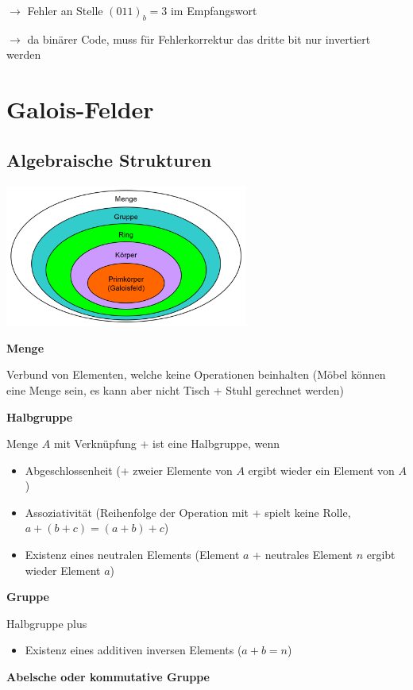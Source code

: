 $\rightarrow$ Fehler an Stelle $(011)_b = 3$ im Empfangswort

$\rightarrow$ da binärer Code, muss für Fehlerkorrektur das dritte bit nur invertiert werden

\section{Galois-Felder}
\label{sec:galois}

\subsection{Algebraische Strukturen}

\includegraphics[width=8cm]{img/algebraische_strukturen.PNG}

\textbf{Menge}

Verbund von Elementen, welche keine Operationen beinhalten (Möbel können eine Menge sein, es kann aber nicht Tisch + Stuhl gerechnet werden)

\textbf{Halbgruppe}

Menge $A$ mit Verknüpfung \frqq +\flqq{} ist eine Halbgruppe, wenn
\begin{itemize}
    \item Abgeschlossenheit (+ zweier Elemente von $A$ ergibt wieder ein Element von $A$)
    \item Assoziativität (Reihenfolge der Operation mit + spielt keine Rolle, $a + (b + c) = (a + b) + c$)
    \item Existenz eines neutralen Elements (Element $a$ + neutrales Element $n$ ergibt wieder Element $a$)
\end{itemize}

\textbf{Gruppe}

Halbgruppe plus
\begin{itemize}
    \item Existenz eines additiven inversen Elements ($a + b = n$)
\end{itemize}

\textbf{Abelsche oder kommutative Gruppe}

